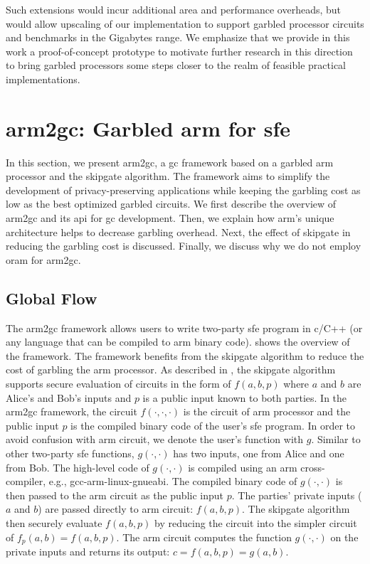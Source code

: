 Such extensions would incur additional area and performance overheads, but would allow upscaling of our implementation to support garbled processor circuits and benchmarks in the Gigabytes range.
We emphasize that we provide in this work a proof-of-concept prototype to motivate further research in this direction to bring garbled processors some steps closer to the realm of feasible practical implementations.

\section{\gls{arm2gc}: Garbled \gls{arm} for \acrshort{sfe}}
In this section, we present \gls{arm2gc}, a \acrshort{gc} framework based on a garbled \gls{arm} processor and the \gls{skipgate} algorithm.
The framework aims to simplify the development of privacy-preserving applications while keeping the garbling cost as low as the best optimized garbled circuits.
We first describe the overview of \gls{arm2gc} and its \acrshort{api} for \acrshort{gc} development.
Then, we explain how \gls{arm}'s unique architecture helps to decrease garbling overhead.
Next, the effect of \gls{skipgate} in reducing the garbling cost is discussed.
Finally, we discuss why we do not employ \acrshort{oram} for \gls{arm2gc}.

\subsection{Global Flow}\label{ssec:arm-global}
The \gls{arm2gc} framework allows users to write two-party \acrshort{sfe} program in \gls{c}/C++ (or any language that can be compiled to \gls{arm} binary code).
 shows the overview of the framework.
The framework benefits from the \gls{skipgate} algorithm to reduce the cost of garbling the \gls{arm} processor.
As described in , the \gls{skipgate} algorithm supports secure evaluation of circuits in the form of $f(a,b,p)$ where $a$ and $b$ are Alice's and Bob's inputs and $p$ is a public input known to both parties.
In the \gls{arm2gc} framework, the circuit $f(\cdot,\cdot,\cdot)$ is the circuit of \gls{arm} processor and the public input $p$ is the compiled binary code of the user's \acrshort{sfe} program.
In order to avoid confusion with \gls{arm} circuit, we denote the user's function with $g$.
Similar to other two-party \acrshort{sfe} functions, $g(\cdot,\cdot)$ has two inputs, one from Alice and one from Bob.
The high-level code of $g(\cdot,\cdot)$ is compiled using an \gls{arm} cross-compiler, e.g., gcc-arm-linux-gnueabi.
The compiled binary code of $g(\cdot,\cdot)$ is then passed to the \gls{arm} circuit as the public input $p$.
The parties' private inputs ($a$ and $b$) are passed directly to \gls{arm} circuit: $f(a,b,p)$.
The \gls{skipgate} algorithm then securely evaluate $f(a,b,p)$ by reducing the circuit into the simpler circuit of $f_{p}(a,b) = f(a,b,p)$.
The \gls{arm} circuit computes the function $g(\cdot,\cdot)$ on the private inputs and returns its output: $c = f(a,b,p) = g(a,b)$.

